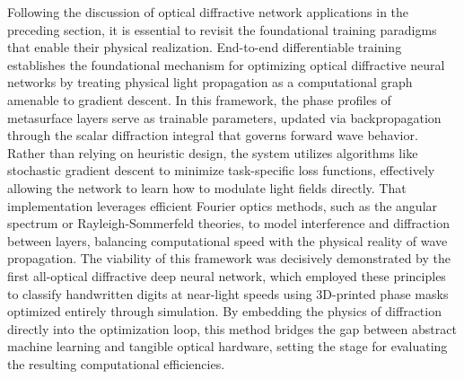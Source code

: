 Following the discussion of optical diffractive network applications in the preceding section, it is essential to revisit the foundational training paradigms that enable their physical realization. End-to-end differentiable training establishes the foundational mechanism for optimizing optical diffractive neural networks by treating physical light propagation as a computational graph amenable to gradient descent. \citep{doi_10_1145_3508352_3549378_13c53996} \citep{doi_10_1364_oe_533298_571e0aea} In this framework, the phase profiles of metasurface layers serve as trainable parameters, updated via backpropagation through the scalar diffraction integral that governs forward wave behavior. \citep{doi_10_1117_12_3056838_7df913be} Rather than relying on heuristic design, the system utilizes algorithms like stochastic gradient descent to minimize task-specific loss functions, effectively allowing the network to learn how to modulate light fields directly. That implementation leverages efficient Fourier optics methods, such as the angular spectrum or Rayleigh-Sommerfeld theories, to model interference and diffraction between layers, balancing computational speed with the physical reality of wave propagation. The viability of this framework was decisively demonstrated by the first all-optical diffractive deep neural network, which employed these principles to classify handwritten digits at near-light speeds using 3D-printed phase masks optimized entirely through simulation. By embedding the physics of diffraction directly into the optimization loop, this method bridges the gap between abstract machine learning and tangible optical hardware, setting the stage for evaluating the resulting computational efficiencies. \citep{s2_f7b7631268f17b1f868015df0bd08ef57904024d_011f3a59} \citep{doi_10_3390_nano14221812_4d7d91b1} \citep{doi_10_1038_s41598_022_19973_0_e156e6e2} \citep{doi_10_3390_life13051148_9434b5b6} \citep{doi_10_1364_josab_497148_b087424b}


